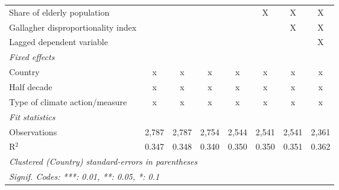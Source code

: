 \begin{tabular}{lccccccc}
   Share of elderly population                                       &               &               &               &               & X             & X             & X\\  
   Gallagher disproportionality index                                &               &               &               &               &               & X             & X\\  
   Lagged dependent variable                                         &               &               &               &               &               &               & X\\  
   \emph{Fixed effects}\\
   Country                                                           & x             & x             & x             & x             & x             & x             & x\\  
   Half decade                                                       & x             & x             & x             & x             & x             & x             & x\\  
   Type of climate action/measure                                    & x             & x             & x             & x             & x             & x             & x\\  
   \midrule \emph{Fit statistics}\\
   Observations                                                      & 2,787         & 2,787         & 2,754         & 2,544         & 2,541         & 2,541         & 2,361\\  
   R$^2$                                                             & 0.347         & 0.348         & 0.340         & 0.350         & 0.350         & 0.351         & 0.362\\  
   \midrule
   \multicolumn{8}{l}{\emph{Clustered (Country) standard-errors in parentheses}}\\
   \multicolumn{8}{l}{\emph{Signif. Codes: ***: 0.01, **: 0.05, *: 0.1}}\\
\end{tabular}
\par\endgroup



